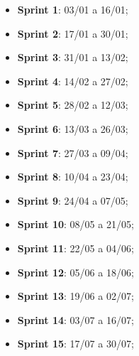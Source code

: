 \begin{multicols}{2}
\begin{itemize}
  \item \textbf{Sprint 1}: 03/01 a 16/01;
  \item \textbf{Sprint 2}: 17/01 a 30/01;
  \item \textbf{Sprint 3}: 31/01 a 13/02;
  \item \textbf{Sprint 4}: 14/02 a 27/02;
  \item \textbf{Sprint 5}: 28/02 a 12/03;
  \item \textbf{Sprint 6}: 13/03 a 26/03;
  \item \textbf{Sprint 7}: 27/03 a 09/04;
  \item \textbf{Sprint 8}: 10/04 a 23/04;
  \item \textbf{Sprint 9}: 24/04 a 07/05;
  \item \textbf{Sprint 10}: 08/05 a 21/05;
  \item \textbf{Sprint 11}: 22/05 a 04/06;
  \item \textbf{Sprint 12}: 05/06 a 18/06;
  \item \textbf{Sprint 13}: 19/06 a 02/07;
  \item \textbf{Sprint 14}: 03/07 a 16/07;
  \item \textbf{Sprint 15}: 17/07 a 30/07;
\end{itemize}
\end{multicols}

